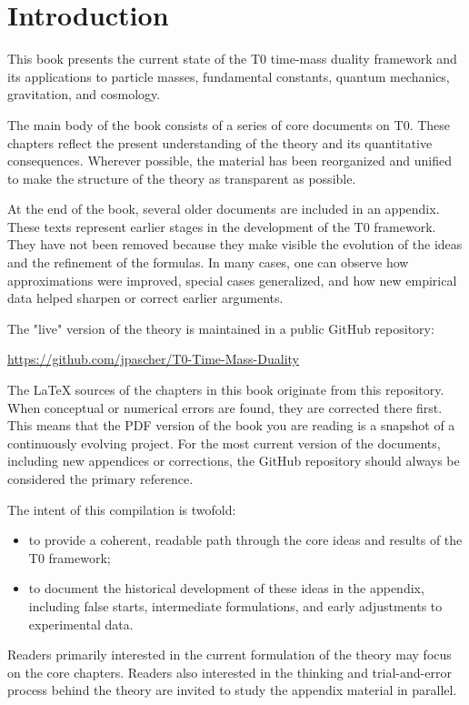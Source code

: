 \chapter*{Introduction}

This book presents the current state of the T0 time-mass duality framework and its applications to particle masses, fundamental constants, quantum mechanics, gravitation, and cosmology.

The main body of the book consists of a series of core documents on T0. These chapters reflect the present understanding of the theory and its quantitative consequences. Wherever possible, the material has been reorganized and unified to make the structure of the theory as transparent as possible.

At the end of the book, several older documents are included in an appendix. These texts represent earlier stages in the development of the T0 framework. They have not been removed because they make visible the evolution of the ideas and the refinement of the formulas. In many cases, one can observe how approximations were improved, special cases generalized, and how new empirical data helped sharpen or correct earlier arguments.

The "live" version of the theory is maintained in a public GitHub repository:

\begin{center}
	\url{https://github.com/jpascher/T0-Time-Mass-Duality}
\end{center}

The LaTeX sources of the chapters in this book originate from this repository. When conceptual or numerical errors are found, they are corrected there first. This means that the PDF version of the book you are reading is a snapshot of a continuously evolving project. For the most current version of the documents, including new appendices or corrections, the GitHub repository should always be considered the primary reference.

The intent of this compilation is twofold:
\begin{itemize}
	\item to provide a coherent, readable path through the core ideas and results of the T0 framework;
	\item to document the historical development of these ideas in the appendix, including false starts, intermediate formulations, and early adjustments to experimental data.
\end{itemize}

Readers primarily interested in the current formulation of the theory may focus on the core chapters. Readers also interested in the thinking and trial-and-error process behind the theory are invited to study the appendix material in parallel.